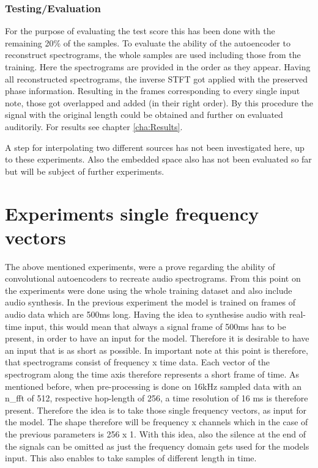 \subsubsection{Testing/Evaluation}
For the purpose of evaluating the test score this has been done with the remaining 20\% of the samples. To evaluate the ability of the autoencoder to reconstruct spectrograms, the whole samples are used including those from the training. Here the spectrograms are provided in the order as they appear. Having all reconstructed spectrograms, the inverse STFT got applied with the preserved phase information. Resulting in the frames corresponding to every single input note, those got overlapped and added (in their right order). By this procedure the signal with the original length could be obtained and further on evaluated auditorily. For results see chapter \ref{cha:Results}. 

A step for interpolating two different sources has not been investigated here, up to these experiments. Also the embedded space also has not been evaluated so far but will be subject of further experiments.

\section{Experiments single frequency vectors}
The above mentioned experiments, were a prove regarding the ability of convolutional autoencoders to recreate audio spectrograms. From this point on the experiments were done using the whole training dataset and also include audio synthesis. In the previous experiment the model is trained on frames of audio data which are 500ms long. Having the idea to synthesise audio with real-time input, this would mean that always a signal frame of 500ms has to be present, in order to have an input for the model. Therefore it is desirable to have an input that is as short as possible. In important note at this point is therefore, that spectrograms consist of frequency x time data. Each vector of the spectrogram along the time axis therefore represents a short frame of time. As mentioned before, when pre-processing is done on 16kHz sampled data with an n\_fft of 512, respective hop-length of 256, a time resolution of 16 ms is therefore present. Therefore the idea is to take those single frequency vectors, as input for the model. The shape therefore will be frequency x channels which in the case of the previous parameters is 256 x 1. With this idea, also the silence at the end of the signals can be omitted as just the frequency domain gets used for the models input. This also enables to take samples of different length in time.


